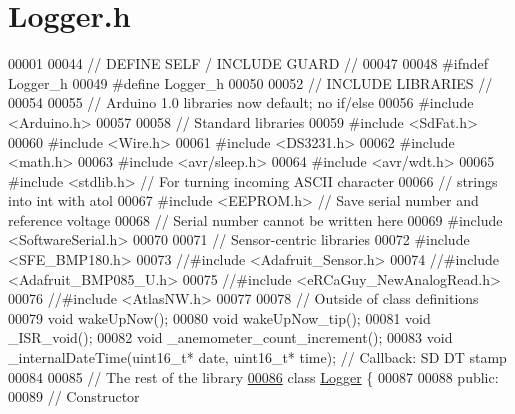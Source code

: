 \hypertarget{Logger_8h_source}{}\section{Logger.\+h}

\begin{DoxyCode}
00001 
00044 \textcolor{comment}{// DEFINE SELF / INCLUDE GUARD //}
00047 \textcolor{comment}{}
00048 \textcolor{preprocessor}{#ifndef Logger\_h}
00049 \textcolor{preprocessor}{#define Logger\_h}
00050 
00052 \textcolor{comment}{// INCLUDE LIBRARIES //}
00054 \textcolor{comment}{}
00055 \textcolor{comment}{// Arduino 1.0 libraries now default; no if/else}
00056 \textcolor{preprocessor}{#include <Arduino.h>}
00057 
00058 \textcolor{comment}{// Standard libraries}
00059 \textcolor{preprocessor}{#include <SdFat.h>}
00060 \textcolor{preprocessor}{#include <Wire.h>}
00061 \textcolor{preprocessor}{#include <DS3231.h>}
00062 \textcolor{preprocessor}{#include <math.h>}
00063 \textcolor{preprocessor}{#include <avr/sleep.h>}
00064 \textcolor{preprocessor}{#include <avr/wdt.h>}
00065 \textcolor{preprocessor}{#include <stdlib.h>} \textcolor{comment}{// For turning incoming ASCII character}
00066                     \textcolor{comment}{// strings into int with atol}
00067 \textcolor{preprocessor}{#include <EEPROM.h>} \textcolor{comment}{// Save serial number and reference voltage}
00068                     \textcolor{comment}{// Serial number cannot be written here}
00069 \textcolor{preprocessor}{#include <SoftwareSerial.h>}
00070 
00071 \textcolor{comment}{// Sensor-centric libraries}
00072 \textcolor{preprocessor}{#include <SFE\_BMP180.h>}
00073 \textcolor{comment}{//#include <Adafruit\_Sensor.h>}
00074 \textcolor{comment}{//#include <Adafruit\_BMP085\_U.h>}
00075 \textcolor{comment}{//#include <eRCaGuy\_NewAnalogRead.h>}
00076 \textcolor{comment}{//#include <AtlasNW.h>}
00077 
00078 \textcolor{comment}{// Outside of class definitions}
00079 \textcolor{keywordtype}{void} wakeUpNow();
00080 \textcolor{keywordtype}{void} wakeUpNow\_tip();
00081 \textcolor{keywordtype}{void} \_ISR\_void();
00082 \textcolor{keywordtype}{void} \_anemometer\_count\_increment();
00083 \textcolor{keywordtype}{void} \_internalDateTime(uint16\_t* date, uint16\_t* time); \textcolor{comment}{// Callback: SD DT stamp}
00084 
00085 \textcolor{comment}{// The rest of the library}
\hypertarget{Logger_8h_source.tex_l00086}{}\hyperlink{classLogger}{00086} \textcolor{keyword}{class }\hyperlink{classLogger}{Logger} \{
00087 
00088   \textcolor{keyword}{public}:
00089     \textcolor{comment}{// Constructor}

\end{DoxyCode}
